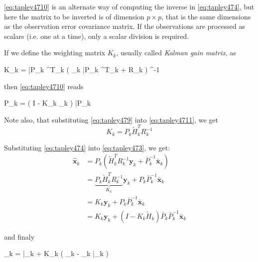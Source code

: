 \ref{eq:tapley4710} is an alternate way of computing the inverse in \ref{eq:tapley474},
but here the matrix to be inverted is of dimension \(p \times p\), that is the
same dimensions as the observation error covariance matrix. If the observations are
processed as scalars (i.e. one at a time), only a scalar division is required.

If we define the weighting matrix \(K_k\), usually called \emph{Kalman gain matrix},
as
\begin{tcolorbox}
	\label{eq:tapley4711}
	K_k = \bar{P}_k ^T_k \left( _k \bar{P}_k ^T_k + R_k \right) ^{-1}
\end{tcolorbox}

then \ref{eq:tapley4710} reads
\begin{tcolorbox}
	\label{eq:tapley4712}
	P_k = \left( I - K_k _k \right) \bar{P}_k
\end{tcolorbox}

Note also, that substituting \ref{eq:tapley479} into \ref{eq:tapley4711}, we get
\begin{equation}
	\label{eq:tapley4714}
	K_k = P_k \tilde{H}^T_k R^{-1}_k
\end{equation}

Substituting \ref{eq:tapley474} into \ref{eq:tapley473}, we get:
\begin{equation}
	\begin{aligned}
		\hat{\bm{x}}_k & = P_k
		\left( \tilde{H}^T_k R^{-1}_k \bm{y}_k + \bar{P}^{-1}_k \bar{\bm{x}}_k \right)                                \\
		               & = \underbrace{P_k \tilde{H}^T_k R^{-1}_k}_{K_k} \bm{y}_k + P_k \bar{P}^{-1}_k \bar{\bm{x}}_k \\
		               & = K_k \bm{y}_k + P_k \bar{P}^{-1}_k \bar{\bm{x}}_k                                           \\
		               & = K_k \bm{y}_k + \left( I - K_k \tilde{H}_k \right) \bar{P}_k \bar{P}^{-1}_k \bar{\bm{x}}_k
	\end{aligned}
\end{equation}

and finaly
\begin{tcolorbox}
	\label{eq:tapley4716}
	_k = \bar{}_k + K_k \left( _k - _k \bar{}_k \right)
\end{tcolorbox}


